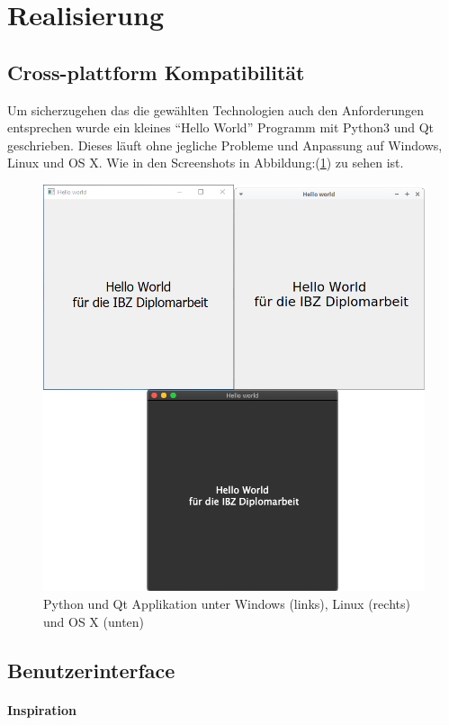 \section{Realisierung}
\label{sec:org084b9b2}
\subsection{Cross-plattform Kompatibilität}
\label{sec:orgc58cfd4}

Um sicherzugehen das die gewählten Technologien auch den Anforderungen
entsprechen wurde ein kleines "`Hello World"' Programm mit Python3 und Qt
geschrieben. Dieses läuft ohne jegliche Probleme und Anpassung auf Windows,
Linux und OS X. Wie in den Screenshots in Abbildung:(\ref{fig:org0701830}) zu sehen
ist.

\begin{figure}[htbp]
\centering
\includegraphics[width=.9\linewidth]{pictures/hello_world.png}
\caption{\label{fig:org0701830}
Python und Qt Applikation unter Windows (links), Linux (rechts) und OS X (unten)}
\end{figure}

\subsection{Benutzerinterface}
\label{sec:org50839f2}
\paragraph{Inspiration}
\label{sec:org1cb94b4}


